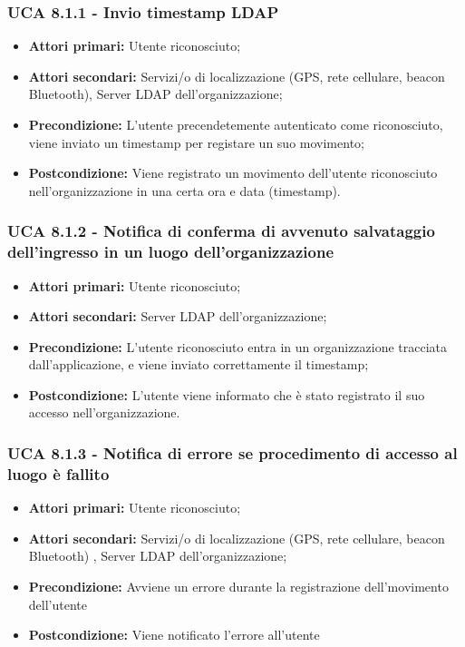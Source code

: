 \subsubsection{UCA 8.1.1 - Invio timestamp LDAP}%
\begin{itemize}
\item \textbf{Attori primari:} Utente riconosciuto;
\item \textbf{Attori secondari:}  Servizi/o di localizzazione (GPS, rete cellulare, beacon Bluetooth), Server LDAP dell'organizzazione;
\item \textbf{Precondizione:} L'utente precendetemente autenticato come riconosciuto, viene inviato un timestamp per registare un suo movimento;
\item \textbf{Postcondizione:} Viene registrato un movimento dell'utente riconosciuto nell'organizzazione in una certa ora e data (timestamp).
\end{itemize}

\subsubsection{UCA 8.1.2 - Notifica di conferma di avvenuto salvataggio dell'ingresso in un luogo dell'organizzazione}%
\begin{itemize}
	\item \textbf{Attori primari:} Utente riconosciuto;
	\item \textbf{Attori secondari:} Server LDAP dell'organizzazione;
	\item \textbf{Precondizione:} L'utente riconosciuto entra in un organizzazione tracciata dall'applicazione, e viene  inviato correttamente il timestamp;
	\item \textbf{Postcondizione:} L'utente viene informato che è stato registrato il suo accesso nell'organizzazione.
\end{itemize}

\subsubsection{UCA 8.1.3 - Notifica di errore se procedimento di accesso al luogo è fallito}%
\begin{itemize}
	\item \textbf{Attori primari:} Utente riconosciuto;
	\item \textbf{Attori secondari:} Servizi/o di localizzazione (GPS, rete cellulare, beacon Bluetooth) , Server LDAP dell'organizzazione;
	\item \textbf{Precondizione:} Avviene un errore durante la registrazione dell'movimento dell'utente
	\item \textbf{Postcondizione:} Viene notificato l'errore all'utente
\end{itemize}

